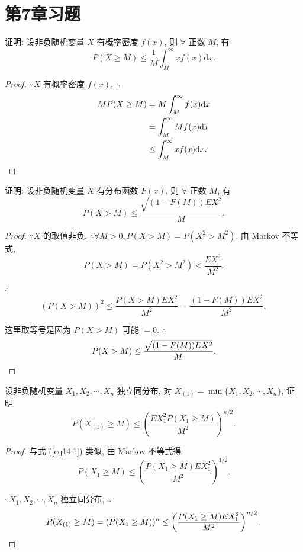 \documentclass[color=black,device=normal,lang=cn]{elegantnote}
\numberwithin{equation}{section}
\theoremstyle{plain}
\newcounter{exsection}[section]
\numberwithin{exercise}{exsection}
\begin{document}
\section{第7章习题}
\addtocounter{exsection}{7}
\begin{exercise}%
    证明: 设非负随机变量 $X$ 有概率密度 $f(x)$, 则 $\forall$ 正数 $M$, 有
    \[P(X\geq M)\leq\dfrac{1}{M}\int_M^\infty xf(x)\mathrm{d}x.\]
\end{exercise}
\begin{proof}
    $\because X$ 有概率密度 $f(x)$, $\therefore$
    \begin{align*}
        MP(X\geq M) & =M\int_M^\infty f(x)\mathrm{d}x \\
        & =\int_M^\infty Mf(x)\mathrm{d}x \\
        & \leq\int_M^\infty xf(x)\mathrm{d}x.\qedhere
    \end{align*}
\end{proof}
\begin{exercise}%
    证明: 设非负随机变量 $X$ 有分布函数 $F(x)$, 则 $\forall$ 正数 $M$, 有
    \[P(X>M)\leq\dfrac{\sqrt{(1-F(M))EX^2}}{M}.\]
\end{exercise}
\begin{proof}
    $\because X$ 的取值非负, $\therefore\forall M>0,P(X>M)=P(X^2>M^2)$. 由 Markov 不等式,
    \[P(X>M)=P(X^2>M^2)<\dfrac{EX^2}{M^2}.\]

    $\therefore$
    \begin{equation}\label{eq14.1}
        (P(X>M))^2\leq\dfrac{P(X>M)EX^2}{M^2}=\dfrac{(1-F(M))EX^2}{M^2},
    \end{equation}

    这里取等号是因为 $P(X>M)$ 可能 $=0$. $\therefore$
    \[P(X>M)\leq\dfrac{\sqrt{(1-F(M))EX^2}}{M}.\qedhere\]
\end{proof}
\begin{exercise}%
    设非负随机变量 $X_1,X_2,\cdots,X_n$ 独立同分布, 对 $X_{(1)}=\min\{X_1,X_2,\cdots,X_n\}$, 证明
    \[P(X_{(1)}\geq M)\leq\left(\dfrac{EX_1^2P(X_1\geq M)}{M^2}\right)^{n/2}.\]
\end{exercise}
\begin{proof}
    与式 (\ref{eq14.1}) 类似, 由 Markov 不等式得
    \[P(X_1\geq M)\leq\left(\dfrac{P(X_1\geq M)EX_1^2}{M^2}\right)^{1/2}.\]

    $\because X_1,X_2,\cdots,X_n$ 独立同分布, $\therefore$
    \[P(X_{(1)}\geq M)=(P(X_1\geq M))^n\leq\left(\dfrac{P(X_1\geq M)EX_1^2}{M^2}\right)^{n/2}.\qedhere\]
\end{proof}
\end{document}
